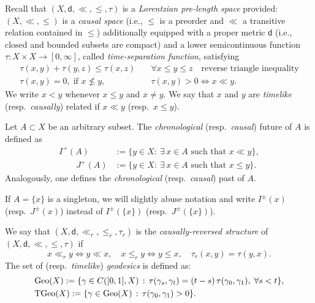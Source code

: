 \documentclass[a4paper,10pt]{article}
\newcommand{\Geo}{{\rm Geo}}
\newcommand{\TGeo}{{\rm TGeo}}
\newcommand{\sfd}{\mathsf d}
\theoremstyle{plain}
\theoremstyle{definition}
\numberwithin{equation}{section}
\begin{document}
Recall that  $(X,\sfd, \ll, \leq, \tau)$ is a \emph{Lorentzian pre-length space} provided:  $(X,\ll,\leq)$ is a \emph{causal space} (i.e., $\leq$ is a preorder and $\ll$ a transitive relation contained in $\leq$)  additionally  equipped with a proper metric $\sfd$  (i.e., closed and bounded subsets are compact) and a lower semicontinuous function $\tau: X\times X\to [0,\infty]$,  called \emph{time-separation function}, satisfying
%
\begin{equation}\nonumber
\begin{split}
\tau(x,y)+\tau(y,z)\leq \tau (x,z) &\quad\forall x\leq y\leq z \quad \text{reverse triangle inequality} \\
\tau(x,y)=0, \; \text{if } x\not\leq y, & \quad  \tau(x,y)>0 \Leftrightarrow x\ll y.
\end{split}
\end{equation}
%
We write $x<y$ whenever $x\le y$ and $x\neq y$. 
We say that $x$ and $y$ are \emph{timelike} (resp.\ \emph{causally}) related if $x\ll y$ (resp.\ $x\le y$).

Let $A\subset X$ be an arbitrary subset. 
The \emph{chronological} (resp.\ \emph{causal}) future of $A$ is defined as
\begin{align*}
I^{+}(A)&:=\{y\in X:\ \exists\, x\in A \text{ such that } x\ll y\},\\ 
\qquad 
J^{+}(A)&:=\{y\in X:\ \exists\, x\in A \text{ such that } x\le y\}.
\end{align*}
Analogously, one defines the \emph{chronological} (resp.\ \emph{causal}) past of $A$.

If $A=\{x\}$ is a singleton, we will slightly abuse notation and write 
$I^{\pm}(x)$ (resp.\ $J^{\pm}(x)$) instead of 
$I^{\pm}(\{x\})$ (resp.\ $J^{\pm}(\{x\})$).

We say that  $(X,\sfd, \ll_r, \leq_r, \tau_r)$ is the \emph{causally-reversed structure} of $(X,\sfd, \ll, \leq, \tau)$ if 
$$
x\ll_r y \iff y\ll x, \quad x\leq_r y\iff y\leq x, \quad \tau_r(x,y)=\tau(y,x).
$$
%
The set of (resp.\ \emph{timelike}) \emph{geodesics} is defined as: 
\begin{align*}
&\Geo(X):= \{ \gamma\in C([0,1], X)\,:  \, \tau(\gamma_{s}, \gamma_{t})=(t-s)\, \tau(\gamma_{0}, \gamma_{1}),\; \forall s<t\},\\
& \TGeo(X):=\{ \gamma\in \Geo(X) \,:  \,  \tau(\gamma_{0}, \gamma_{1}) > 0\}.   
\end{align*}
\end{document}
